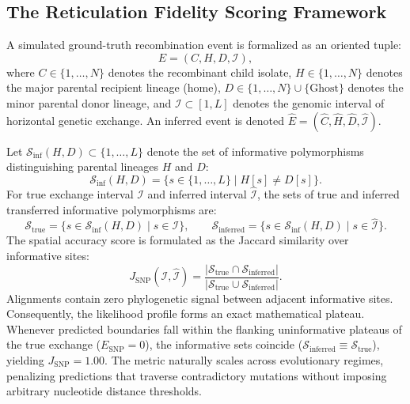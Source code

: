 \subsection{The Reticulation Fidelity Scoring Framework}
\label{subsec:methods_scoring_framework}

A simulated ground-truth recombination event is formalized as an oriented tuple:
\begin{equation}
E = (C, H, D, \mathcal{I}),
\label{eq:methods_event_tuple}
\end{equation}
where $C \in \{1, \dots, N\}$ denotes the recombinant child isolate, $H \in \{1, \dots, N\}$ denotes the major parental recipient lineage (home), $D \in \{1, \dots, N\} \cup \{\text{Ghost}\}$ denotes the minor parental donor lineage, and $\mathcal{I} \subset [1, L]$ denotes the genomic interval of horizontal genetic exchange.
An inferred event is denoted $\hat{E} = (\hat{C}, \hat{H}, \hat{D}, \hat{\mathcal{I}})$.

Let $\mathcal{S}_{\text{inf}}(H, D) \subset \{1, \dots, L\}$ denote the set of informative polymorphisms distinguishing parental lineages $H$ and $D$:
\begin{equation}
\mathcal{S}_{\text{inf}}(H, D) = \{s \in \{1, \dots, L\} \mid H[s] \neq D[s]\}.
\label{eq:methods_inf_set}
\end{equation}
For true exchange interval $\mathcal{I}$ and inferred interval $\hat{\mathcal{I}}$, the sets of true and inferred transferred informative polymorphisms are:
\begin{equation}
\mathcal{S}_{\text{true}} = \{s \in \mathcal{S}_{\text{inf}}(H, D) \mid s \in \mathcal{I}\}, \qquad \mathcal{S}_{\text{inferred}} = \{s \in \mathcal{S}_{\text{inf}}(H, D) \mid s \in \hat{\mathcal{I}}\}.
\end{equation}
The spatial accuracy score is formulated as the Jaccard similarity over informative sites:
\begin{equation}
J_{\text{SNP}}(\mathcal{I}, \hat{\mathcal{I}}) = \frac{|\mathcal{S}_{\text{true}} \cap \mathcal{S}_{\text{inferred}}|}{|\mathcal{S}_{\text{true}} \cup \mathcal{S}_{\text{inferred}}|}.
\label{eq:methods_j_snp}
\end{equation}
Alignments contain zero phylogenetic signal between adjacent informative sites.
Consequently, the likelihood profile forms an exact mathematical plateau.
Whenever predicted boundaries fall within the flanking uninformative plateaus of the true exchange ($E_{\text{SNP}} = 0$), the informative sets coincide ($\mathcal{S}_{\text{inferred}} \equiv \mathcal{S}_{\text{true}}$), yielding $J_{\text{SNP}} = 1.00$.
The metric naturally scales across evolutionary regimes, penalizing predictions that traverse contradictory mutations without imposing arbitrary nucleotide distance thresholds.

